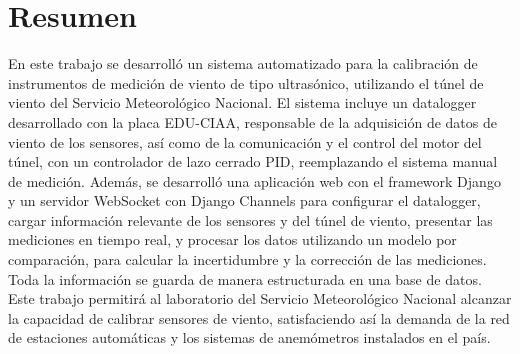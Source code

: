 \chapter*{Resumen}
En este trabajo se desarrolló un sistema automatizado para la calibración de instrumentos de medición de viento de tipo ultrasónico, utilizando el túnel de viento del Servicio Meteorológico Nacional. El sistema incluye un datalogger desarrollado con la placa EDU-CIAA, responsable de la adquisición de datos de viento de los sensores, así como de la comunicación y el control del motor del túnel, con un controlador de lazo cerrado PID, reemplazando el sistema manual de medición. Además, se desarrolló una aplicación web con el framework Django y un servidor WebSocket con Django Channels  para configurar el datalogger, cargar información relevante de los sensores y del túnel de viento, presentar las mediciones en tiempo real, y procesar los datos utilizando un modelo por comparación, para calcular la incertidumbre y la corrección de las mediciones. Toda la información se guarda de manera estructurada en una base de datos. Este trabajo permitirá al laboratorio del Servicio Meteorológico Nacional alcanzar la capacidad de calibrar sensores de viento, satisfaciendo así la demanda de la red de estaciones automáticas y los sistemas de anemómetros instalados en el país.


